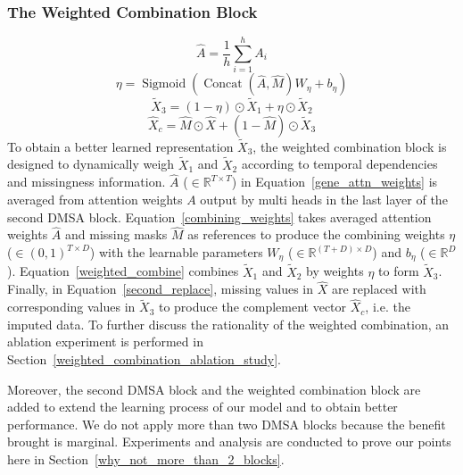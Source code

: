 \documentclass{article}
\begin{document}
\subsubsection{The Weighted Combination Block} \label{SAITS: the weighted combination block}
\begin{equation} \label{gene_attn_weights}
	\hat{A} = \frac{1}{h} \sum_{i=1}^h A_i
\end{equation}
\begin{equation} \label{combining_weights}
	\eta = \operatorname{Sigmoid}\left(\operatorname{Concat}\left(\hat{A}, \hat{M} \right) W_{\eta} + b_{\eta} \right)
\end{equation}
\begin{equation} \label{weighted_combine}
	\tilde{X}_3 = \left(1 - \eta \right) \odot \tilde{X}_1 + \eta \odot \tilde{X}_2
\end{equation}
\begin{equation} \label{second_replace}
	\hat{X}_c = \hat{M}\odot \hat{X} + \left(1 - \hat{M} \right)\odot \tilde{X}_3
\end{equation} 
To obtain a better learned representation $\tilde{X}_3$, the weighted combination block is designed to dynamically weigh $\tilde{X}_1$ and $\tilde{X}_2$ according to temporal dependencies and missingness information. $\hat{A}$ ($\in \mathbb{R}^{T \times T}$) in Equation~\ref{gene_attn_weights} is averaged from attention weights $A$ output by multi heads in the last layer of the second DMSA block. Equation~\ref{combining_weights} takes averaged attention weights $\hat{A}$ and missing masks $\hat{M}$ as references to produce the combining weights $\eta$ ($\in (0, 1)^{T \times D}$) with the learnable parameters $W_\eta$ ($\in \mathbb{R}^{(T+D) \times D}$) and $b_\eta$ ($\in \mathbb{R}^{D}$). Equation~\ref{weighted_combine} combines $\tilde{X}_1$ and $\tilde{X}_2$ by weights $\eta$ to form $\tilde{X}_3$. Finally, in Equation~\ref{second_replace}, missing values in $\hat{X}$ are replaced with corresponding values in $\tilde{X}_3$ to produce the complement vector $\hat{X}_c$, i.e. the imputed data. To further discuss the rationality of the weighted combination, an ablation experiment is performed in Section~\ref{weighted_combination_ablation_study}.

Moreover, the second DMSA block and the weighted combination block are added to extend the learning process of our model and to obtain better performance. We do not apply more than two DMSA blocks because the benefit brought is marginal. Experiments and analysis are conducted to prove our points here in Section~\ref{why_not_more_than_2_blocks}.
\end{document}
